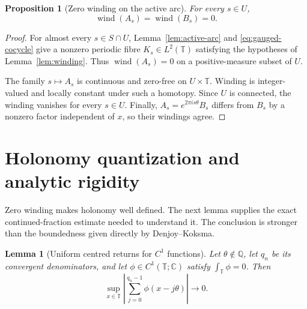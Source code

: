 \documentclass[reqno]{amsart}
\newtheorem{proposition}[theorem]{Proposition}
\newtheorem{lemma}[theorem]{Lemma}
\theoremstyle{remark}
\numberwithin{equation}{section}
\newcommand{\Q}{\mathbb{Q}}
\newcommand{\T}{\mathbb{T}}
\newcommand{\C}{\mathbb{C}}
\newcommand{\wind}{\operatorname{wind}}
\begin{document}
\begin{proposition}[Zero winding on the active arc]
\label{prop:zero-winding}
For every \(s\in U\),
\[
  \wind(A_s)=\wind(B_s)=0.
\]
\end{proposition}

\begin{proof}
For almost every \(s\in S\cap U\), Lemma~\ref{lem:active-arc} and
\eqref{eq:gauged-cocycle} give a nonzero periodic fibre
\(K_s\in L^2(\T)\) satisfying the hypotheses of Lemma~\ref{lem:winding}.
Thus \(\wind(A_s)=0\) on a positive-measure subset of \(U\).

The family \(s\mapsto A_s\) is continuous and zero-free on
\(U\times\T\). Winding is integer-valued and locally constant under such a
homotopy. Since \(U\) is connected, the winding vanishes for every
\(s\in U\). Finally, \(A_s=e^{2\pi i s\theta}B_s\) differs from \(B_s\) by
a nonzero factor independent of \(x\), so their windings agree.
\end{proof}

\section{Holonomy quantization and analytic rigidity}
\label{sec:quantization}

Zero winding makes holonomy well defined. The next lemma supplies the exact
continued-fraction estimate needed to understand it. The conclusion is
stronger than the boundedness given directly by Denjoy--Koksma.

\begin{lemma}[Uniform centred returns for \(C^1\) functions]
\label{lem:centered-return}
Let \(\theta\notin\Q\), let \(q_n\) be its convergent denominators, and let
\(\phi\in C^1(\T;\C)\) satisfy \(\int_\T\phi=0\). Then
\begin{equation}
  \sup_{x\in\T}
  \left|
    \sum_{j=0}^{q_n-1}\phi(x-j\theta)
  \right|
  \longrightarrow0.
  \label{eq:centered-return-zero}
\end{equation}
\end{lemma}
\end{document}
